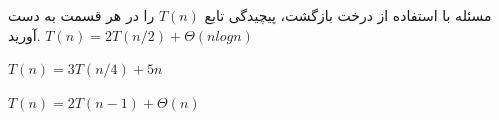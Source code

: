 ‌مسئله
با استفاده از درخت بازگشت، پیچیدگی تابع $T(n)$ را در هر قسمت به دست آورید.
$T(n) = 2T(n/2) + \Theta(nlogn)$

$T(n) =3T(n/4) + 5n$

$T(n) = 2T(n-1) + \Theta(n)$












